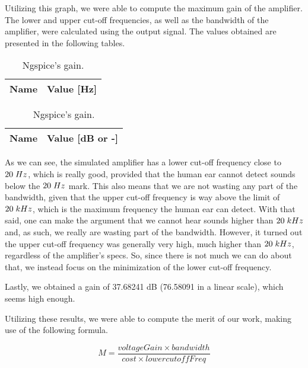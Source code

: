 Utilizing this graph, we were able to compute the maximum gain of the amplifier. The lower and upper cut-off frequencies, as well as the bandwidth
of the amplifier, were calculated using the output signal.
The values obtained are presented in the following tables.

\begin{table}[h]
  \parbox{.45\linewidth}{
    \centering
    \begin{tabular}{|c|c|}
      \hline
      {\bf Name} & {\bf Value [Hz]} \\ \hline
      
    \end{tabular}
    \caption{Ngspice's cut-off frequencies and bandwidth.}
  }
  \hfill
  \parbox{.45\linewidth}{
    \centering
    \begin{tabular}{|c|c|}
      \hline
      {\bf Name} & {\bf Value [dB or -]} \\ \hline
      
    \end{tabular}
    \caption{Ngspice's gain.}
  }
\end{table}

As we can see, the simulated amplifier has a lower cut-off frequency close to $20\hspace{1mm}Hz$, which is really good, provided that the human 
ear cannot detect sounds below the $20\hspace{1mm}Hz$ mark. This also means that we are not wasting any part of the bandwidth, given that the upper cut-off
frequency is way above the limit of $20\hspace{1mm}kHz$, which is the maximum frequency the human ear can detect. With that said, one can make the argument
that we cannot hear sounds higher than $20\hspace{1mm}kHz$ and, as such, we really are wasting part of the bandwidth. However, it turned out the upper
cut-off frequency was generally very high, much higher than $20\hspace{1mm}kHz$, regardless of the amplifier's specs. So, since there is not much we can do 
about that, we instead focus on the minimization of the lower cut-off frequency.

Lastly, we obtained a gain of 37.68241 dB (76.58091 in a linear scale), which seems high enough.

Utilizing these results, we were able to compute the merit of our work, making use of the following formula.

\begin{equation}
  M=\dfrac{voltageGain\times bandwidth}{cost\times lowercutoffFreq}
\end{equation}

